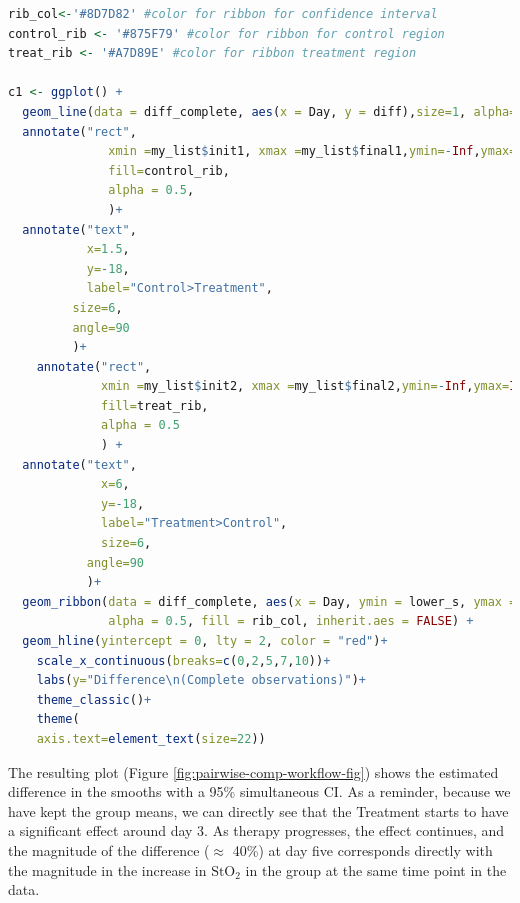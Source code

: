 \documentclass[
]{article}
\begin{document}
\begin{lstlisting}[language=R]
rib_col<-'#8D7D82' #color for ribbon for confidence interval
control_rib <- '#875F79' #color for ribbon for control region
treat_rib <- '#A7D89E' #color for ribbon treatment region

c1 <- ggplot() +
  geom_line(data = diff_complete, aes(x = Day, y = diff),size=1, alpha=0.5) +
  annotate("rect",
              xmin =my_list$init1, xmax =my_list$final1,ymin=-Inf,ymax=Inf,
              fill=control_rib,
              alpha = 0.5,
              )+
  annotate("text",
           x=1.5,
           y=-18,
           label="Control>Treatment",
         size=6,
         angle=90
         )+
    annotate("rect",
             xmin =my_list$init2, xmax =my_list$final2,ymin=-Inf,ymax=Inf,
             fill=treat_rib,
             alpha = 0.5
             ) +
  annotate("text",
             x=6,
             y=-18,
             label="Treatment>Control",
             size=6,
           angle=90
           )+
  geom_ribbon(data = diff_complete, aes(x = Day, ymin = lower_s, ymax = upper_s),
              alpha = 0.5, fill = rib_col, inherit.aes = FALSE) +
  geom_hline(yintercept = 0, lty = 2, color = "red")+
    scale_x_continuous(breaks=c(0,2,5,7,10))+
    labs(y="Difference\n(Complete observations)")+
    theme_classic()+
    theme(
    axis.text=element_text(size=22))
\end{lstlisting}

The resulting plot (Figure \ref{fig:pairwise-comp-workflow-fig}) shows the estimated difference in the smooths with a 95\% simultaneous CI. As a reminder, because we have kept the group means, we can directly see that the Treatment starts to have a significant effect around day 3. As therapy progresses, the effect continues, and the magnitude of the difference (\(\approx\) 40\%) at day five corresponds directly with the magnitude in the increase in \(\mbox{StO}_2\) in the group at the same time point in the data.
\end{document}
